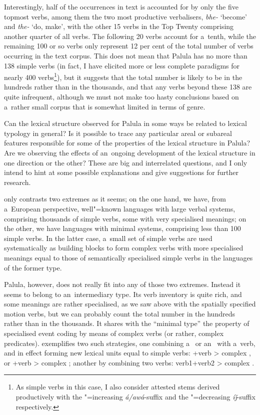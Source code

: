 Interestingly, half of the occurrences in text is accounted for by only the five topmost verbs, among them the two most productive verbalisers, \textit{bhe-} `become' and \textit{the-} `do, make', with the other 15 verbs in the Top Twenty comprising another quarter of all verbs. The following 20 verbs account for a~tenth, while the remaining 100 or so verbs only represent 12 per cent of the total number of verbs occurring in the text corpus. This does not mean that Palula has no more than 138 simple verbs (in fact, I have elicited more or less complete paradigms for nearly 400 verbs\footnote{As simple verbs in this case, I also consider attested stems derived productively with the "=increasing \textit{á/awá}-suffix and the "=decreasing \textit{íǰ}-suffix respectively.}), but it suggests that the total number is likely to be in the hundreds rather than in the thousands, and that any verbs beyond these 138 are quite infrequent, although we must not make too hasty conclusions based on a~rather small corpus that is somewhat limited in terms of genre.



Can the lexical structure observed for Palula in some ways be related to lexical typology in general? Is it possible to trace any particular areal or subareal features responsible for some of the properties of the lexical structure in Palula? Are we observing the effects of an~ongoing development of the lexical structure in one direction or the other? These are big and interrelated questions, and I only intend to hint at some possible explanations and give suggestions for further research.



\citet[409]{viberg2006} only contrasts two extremes as it seems; on the one hand, we have, from a~European perspective, well"=known languages with large verbal systems, comprising thousands of simple verbs, some with very specialised meanings; on the other, we have languages with minimal systems, comprising less than 100 simple verbs. In the latter case, a~small set of simple verbs are used systematically as building blocks to form complex verbs with more specialised meanings equal to those of semantically specialised simple verbs in the languages of the former type. 



Palula, however, does not really fit into any of those two extremes. Instead it seems to belong to an~intermediary type. Its verb inventory is quite rich, and some meanings are rather specialised, as we saw above with the spatially specified motion verbs, but we can probably count the total number in the hundreds rather than in the thousands. It shares with the ``minimal type'' the property of specialised event coding by means of complex verbs (or rather, complex predicates). \citet[348]{viberg2006} exemplifies two such strategies, one combining a~ or an~ with a~verb, and in effect forming new lexical units equal to simple verbs: +verb {\textgreater} complex , or +verb {\textgreater} complex ; another by combining two verbs: verb1+verb2 {\textgreater} complex . 




